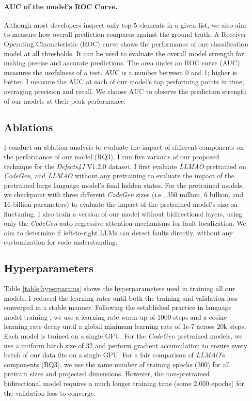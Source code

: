 \documentclass[12pt,openany,oneside,table]{cmuthesis}
\begin{document}
    \vspace{-0.5em}
    \paragraph{AUC of the model's ROC Curve.}
    Although most developers inspect only top-5 elements in a given list, we also aim to measure how overall prediction compares against the ground truth.
    A Receiver Operating Characteristic (ROC) curve shows the performance of one classification model at all thresholds. It can be used to evaluate the overall model strength for making precise and accurate predictions. The area under an ROC curve (AUC) measures the usefulness of a test. AUC is a number between 0 and 1; higher is better.  I measure the AUC at each of our model's top performing points in time, averaging precision and recall. We choose AUC to observe the prediction strength of our models at their peak performance. 
    
    \subsection{Ablations}
    I conduct an ablation analysis to evaluate the impact of different components on the performance of our model (RQ3). 
    I run five variants of our proposed technique for the \textit{Defects4J} V1.2.0 dataset.
    I first evaluate \textit{LLMAO} pretrained on \textit{CodeGen}, and \textit{LLMAO} without any pretraining to evaluate the impact of the pretrained large language model's final hidden states.
    For the pretrained models, we checkpoint with three different \textit{CodeGen} sizes (i.e., 350 million, 6 billion, and 16 billion parameters) to evaluate the impact of the pretrained model's size on finetuning. 
    I also train a version of our model without bidirectional layers, using only the \textit{CodeGen} auto-regressive attention mechanisms for fault localization. We aim to determine if left-to-right LLMs can detect faults directly, without any customization for code understanding. 
    
    
    \subsection{Hyperparameters}
    \label{sec:hyperparameters}
    Table \ref{table:hyperparams} shows the hyperparameters used in training all our models.
    I reduced the learning rates until both the training and validation loss converged in a stable manner. Following the established practice in language model training \cite{hoffmann2022training}, we use a learning rate warm-up of 1000 steps and a cosine learning rate decay until a global minimum learning rate of 1e-7 across 20k steps.
    Each model is trained on a single GPU. For the \textit{CodeGen} pretrained models, we use a uniform batch size of 32 and perform gradient accumulation to ensure every batch of our data fits on a single GPU.
    For a fair comparison of \textit{LLMAO}'s components (RQ3), we use the same number of  training epochs (300) for all pretrain sizes and projected dimensions. However, the non-pretrained bidirectional model requires a much longer training time (some 2,000 epochs) for the validation loss to converge.
    
\end{document}
